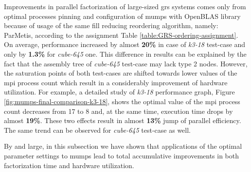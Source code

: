 Improvements in parallel factorization of large-sized \acrshort{grs} systems comes only from optimal processes pinning and configuration of \acrshort{mumps} with OpenBLAS library because of usage of the same fill reducing reordering algorithm, namely: ParMetis, according to the assignment Table \ref{table:GRS-ordering-assignment}. On average, performance increased by almost \textbf{20\%} in case of \textit{k3-18} test-case and only by \textbf{1.3\%} for \textit{cube-645} one. This difference in results can be explained by the fact that the assembly tree of \textit{cube-645} test-case may lack type 2 nodes. However, the saturation points of both test-cases are shifted towards lower values of  the \acrshort{mpi} process count which result in a considerably improvement of hardware utilization. For example, a detailed study of \textit{k3-18} performance graph, Figure \ref{fig:mumps-final-comparison-k3-18}, shows the optimal value of the \acrshort{mpi} process count  decreases from 17 to 8 and, at the same time, execution time drops by almost \textbf{19\%}. These two effects result in almost \textbf{13\%} jump of parallel efficiency. The same trend can be observed for \textit{cube-645} test-case as well.\\


\begin{minipage}{\textwidth}
By and large, in this subsection we have shown that applications of the optimal parameter settings to \acrshort{mumps} lead to total accumulative improvements in both factorization time and hardware utilization.\\
\end{minipage}


